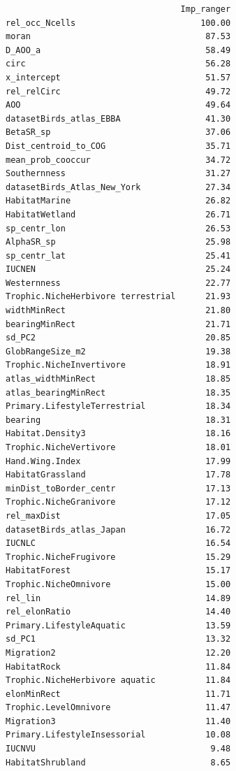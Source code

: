\documentclass[
  letterpaper,
  DIV=11,
  numbers=noendperiod]{scrreprt}
\begin{document}
\begin{verbatim}
                                   Imp_ranger
rel_occ_Ncells                         100.00
moran                                   87.53
D_AOO_a                                 58.49
circ                                    56.28
x_intercept                             51.57
rel_relCirc                             49.72
AOO                                     49.64
datasetBirds_atlas_EBBA                 41.30
BetaSR_sp                               37.06
Dist_centroid_to_COG                    35.71
mean_prob_cooccur                       34.72
Southernness                            31.27
datasetBirds_Atlas_New_York             27.34
HabitatMarine                           26.82
HabitatWetland                          26.71
sp_centr_lon                            26.53
AlphaSR_sp                              25.98
sp_centr_lat                            25.41
IUCNEN                                  25.24
Westernness                             22.77
Trophic.NicheHerbivore terrestrial      21.93
widthMinRect                            21.80
bearingMinRect                          21.71
sd_PC2                                  20.85
GlobRangeSize_m2                        19.38
Trophic.NicheInvertivore                18.91
atlas_widthMinRect                      18.85
atlas_bearingMinRect                    18.35
Primary.LifestyleTerrestrial            18.34
bearing                                 18.31
Habitat.Density3                        18.16
Trophic.NicheVertivore                  18.01
Hand.Wing.Index                         17.99
HabitatGrassland                        17.78
minDist_toBorder_centr                  17.13
Trophic.NicheGranivore                  17.12
rel_maxDist                             17.05
datasetBirds_atlas_Japan                16.72
IUCNLC                                  16.54
Trophic.NicheFrugivore                  15.29
HabitatForest                           15.17
Trophic.NicheOmnivore                   15.00
rel_lin                                 14.89
rel_elonRatio                           14.40
Primary.LifestyleAquatic                13.59
sd_PC1                                  13.32
Migration2                              12.20
HabitatRock                             11.84
Trophic.NicheHerbivore aquatic          11.84
elonMinRect                             11.71
Trophic.LevelOmnivore                   11.47
Migration3                              11.40
Primary.LifestyleInsessorial            10.08
IUCNVU                                   9.48
HabitatShrubland                         8.65

\end{verbatim}
\end{document}
